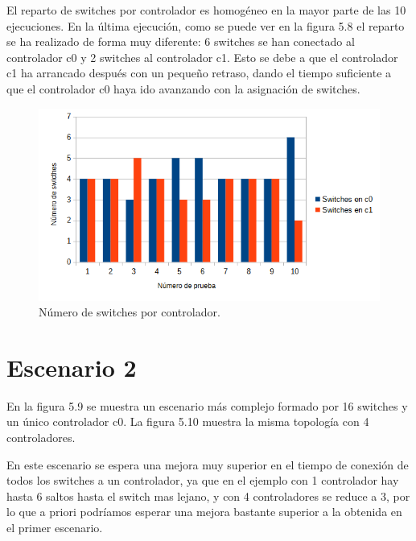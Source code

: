 \documentclass[a4paper, 12pt]{book}
\begin{document}
 	El reparto de switches por controlador es homogéneo en la mayor parte de las 10 ejecuciones. En la última ejecución, como se puede ver en la figura 5.8 el reparto se ha realizado de forma muy diferente: 6 switches se han conectado al controlador c0 y 2 switches al controlador c1. Esto se debe a que el controlador c1 ha arrancado después con un pequeño retraso, dando el tiempo suficiente a que el controlador c0 haya ido avanzando con la asignación de switches. 
 	
 	\begin{figure}[H]
 		\centering
 		\includegraphics[width=16cm, keepaspectratio]{img/switchesporcontrollerescenario1}
 		\caption{Número de switches por controlador.}
 		\label{figura:switchesporcontrollerescenario1}
 	\end{figure}
 	
 	
 	
 	\clearpage
 	\section{Escenario 2}
 	
 	En la figura 5.9 se muestra un escenario más complejo formado por 16 switches y un único
 	controlador c0. La figura 5.10 muestra la misma topología con 4 controladores.
 		
 	En este escenario se espera una mejora muy superior en el tiempo de conexión de todos los switches a un controlador, ya que en el ejemplo con 1 controlador hay hasta 6 saltos hasta el switch mas lejano, y con 4 controladores se reduce a 3, por lo que a priori podríamos esperar una mejora bastante superior a la obtenida en el primer escenario.
 	
\end{document}
